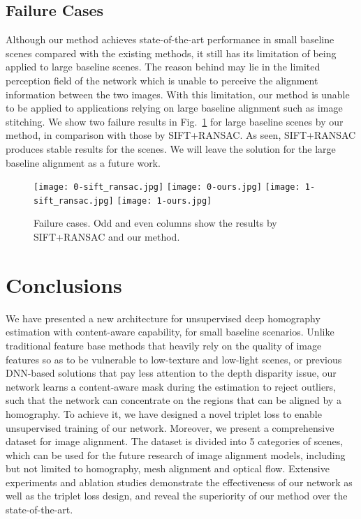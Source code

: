 \documentclass[runningheads]{llncs}
\begin{document}
\subsection{Failure Cases}
Although our method achieves state-of-the-art performance in small baseline scenes compared with the existing methods, it still has its limitation of being applied to large baseline scenes. The reason behind may lie in the limited perception field of the network which is unable to perceive the alignment information between the two images. With this limitation, our method is unable to be applied to applications relying on large baseline alignment such as image stitching. We show two failure results in Fig.~\ref{fig:failure-case} for large baseline scenes by our method, in comparison with those by SIFT+RANSAC. As seen, SIFT+RANSAC produces stable results for the scenes. We will leave the solution for the large baseline alignment as a future work.

\begin{figure}[t]
  \centering
  \texttt{[image: 0-sift\_ransac.jpg]}
  \texttt{[image: 0-ours.jpg]}
  \texttt{[image: 1-sift\_ransac.jpg]}
  \texttt{[image: 1-ours.jpg]}
  \caption{Failure cases. Odd and even columns show the results by SIFT+RANSAC and our method.}\label{fig:failure-case}
\end{figure}



\section{Conclusions}\label{sec:conclu}

We have presented a new architecture for unsupervised deep homography estimation with content-aware capability, for small baseline scenarios. Unlike traditional feature base methods that heavily rely on the quality of image features so as to be vulnerable to low-texture and low-light scenes, or previous DNN-based solutions that pay less attention to the depth disparity issue, our network learns a content-aware mask during the estimation to reject outliers, such that the network can concentrate on the regions that can be aligned by a homography. To achieve it, we have designed a novel triplet loss to enable unsupervised training of our network. Moreover, we present a comprehensive dataset for image alignment. The dataset is divided into 5 categories of scenes, which can be used for the future research of image alignment models, including but not limited to homography, mesh alignment and optical flow. Extensive experiments and ablation studies demonstrate the effectiveness of our network as well as the triplet loss design, and reveal the superiority of our method over the state-of-the-art.
\end{document}
